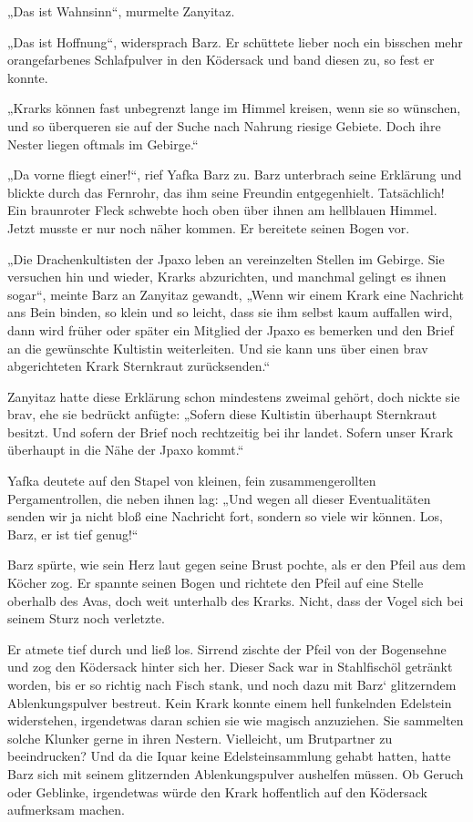 „Das ist Wahnsinn“, murmelte Zanyitaz.

„Das ist Hoffnung“, widersprach Barz. Er schüttete lieber noch ein bisschen mehr orangefarbenes Schlafpulver in den Ködersack und band diesen zu, so fest er konnte.

„Krarks können fast unbegrenzt lange im Himmel kreisen, wenn sie so wünschen, und so überqueren sie auf der Suche nach Nahrung riesige Gebiete. Doch ihre Nester liegen oftmals im Gebirge.“

„Da vorne fliegt einer!“, rief Yafka Barz zu. Barz unterbrach seine Erklärung und blickte durch das Fernrohr, das ihm seine Freundin entgegenhielt. Tatsächlich! Ein braunroter Fleck schwebte hoch oben über ihnen am hellblauen Himmel. Jetzt musste er nur noch näher kommen. Er bereitete seinen Bogen vor.

„Die Drachenkultisten der Jpaxo leben an vereinzelten Stellen im Gebirge. Sie versuchen hin und wieder, Krarks abzurichten, und manchmal gelingt es ihnen sogar“, meinte Barz an Zanyitaz gewandt, „Wenn wir einem Krark eine Nachricht ans Bein binden, so klein und so leicht, dass sie ihm selbst kaum auffallen wird, dann wird früher oder später ein Mitglied der Jpaxo es bemerken und den Brief an die gewünschte Kultistin weiterleiten. Und sie kann uns über einen brav abgerichteten Krark Sternkraut zurücksenden.“

Zanyitaz hatte diese Erklärung schon mindestens zweimal gehört, doch nickte sie brav, ehe sie bedrückt anfügte: „Sofern diese Kultistin überhaupt Sternkraut besitzt. Und sofern der Brief noch rechtzeitig bei ihr landet. Sofern unser Krark überhaupt in die Nähe der Jpaxo kommt.“

Yafka deutete auf den Stapel von kleinen, fein zusammengerollten Pergamentrollen, die neben ihnen lag: „Und wegen all dieser Eventualitäten senden wir ja nicht bloß eine Nachricht fort, sondern so viele wir können. Los, Barz, er ist tief genug!“

Barz spürte, wie sein Herz laut gegen seine Brust pochte, als er den Pfeil aus dem Köcher zog. Er spannte seinen Bogen und richtete den Pfeil auf eine Stelle oberhalb des Avas, doch weit unterhalb des Krarks. Nicht, dass der Vogel sich bei seinem Sturz noch verletzte.

Er atmete tief durch und ließ los. Sirrend zischte der Pfeil von der Bogensehne und zog den Ködersack hinter sich her. Dieser Sack war in Stahlfischöl getränkt worden, bis er so richtig nach Fisch stank, und noch dazu mit Barz‘ glitzerndem Ablenkungspulver bestreut. Kein Krark konnte einem hell funkelnden Edelstein widerstehen, irgendetwas daran schien sie wie magisch anzuziehen. Sie sammelten solche Klunker gerne in ihren Nestern. Vielleicht, um Brutpartner zu beeindrucken? Und da die Iquar keine Edelsteinsammlung gehabt hatten, hatte Barz sich mit seinem glitzernden Ablenkungspulver aushelfen müssen. Ob Geruch oder Geblinke, irgendetwas würde den Krark hoffentlich auf den Ködersack aufmerksam machen.


